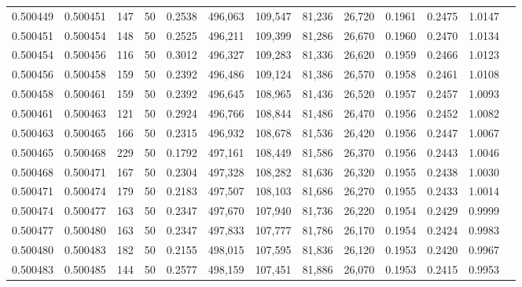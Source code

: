 \begin{tabular}{rrrrrrrrrrrrr}
0.500449 & 0.500451 & 147 &  50 &                                     0.2538 & 496,063 & 109,547 &  81,236 &  26,720 & 0.1961 & 0.2475 & 1.0147 \\
0.500451 & 0.500454 & 148 &  50 &                                     0.2525 & 496,211 & 109,399 &  81,286 &  26,670 & 0.1960 & 0.2470 & 1.0134 \\
0.500454 & 0.500456 & 116 &  50 &                                     0.3012 & 496,327 & 109,283 &  81,336 &  26,620 & 0.1959 & 0.2466 & 1.0123 \\
0.500456 & 0.500458 & 159 &  50 &                                     0.2392 & 496,486 & 109,124 &  81,386 &  26,570 & 0.1958 & 0.2461 & 1.0108 \\
0.500458 & 0.500461 & 159 &  50 &                                     0.2392 & 496,645 & 108,965 &  81,436 &  26,520 & 0.1957 & 0.2457 & 1.0093 \\
0.500461 & 0.500463 & 121 &  50 &                                     0.2924 & 496,766 & 108,844 &  81,486 &  26,470 & 0.1956 & 0.2452 & 1.0082 \\
0.500463 & 0.500465 & 166 &  50 &                                     0.2315 & 496,932 & 108,678 &  81,536 &  26,420 & 0.1956 & 0.2447 & 1.0067 \\
0.500465 & 0.500468 & 229 &  50 &                                     0.1792 & 497,161 & 108,449 &  81,586 &  26,370 & 0.1956 & 0.2443 & 1.0046 \\
0.500468 & 0.500471 & 167 &  50 &                                     0.2304 & 497,328 & 108,282 &  81,636 &  26,320 & 0.1955 & 0.2438 & 1.0030 \\
0.500471 & 0.500474 & 179 &  50 &                                     0.2183 & 497,507 & 108,103 &  81,686 &  26,270 & 0.1955 & 0.2433 & 1.0014 \\
0.500474 & 0.500477 & 163 &  50 &                                     0.2347 & 497,670 & 107,940 &  81,736 &  26,220 & 0.1954 & 0.2429 & 0.9999 \\
0.500477 & 0.500480 & 163 &  50 &                                     0.2347 & 497,833 & 107,777 &  81,786 &  26,170 & 0.1954 & 0.2424 & 0.9983 \\
0.500480 & 0.500483 & 182 &  50 &                                     0.2155 & 498,015 & 107,595 &  81,836 &  26,120 & 0.1953 & 0.2420 & 0.9967 \\
0.500483 & 0.500485 & 144 &  50 &                                     0.2577 & 498,159 & 107,451 &  81,886 &  26,070 & 0.1953 & 0.2415 & 0.9953 \\

\end{tabular}
